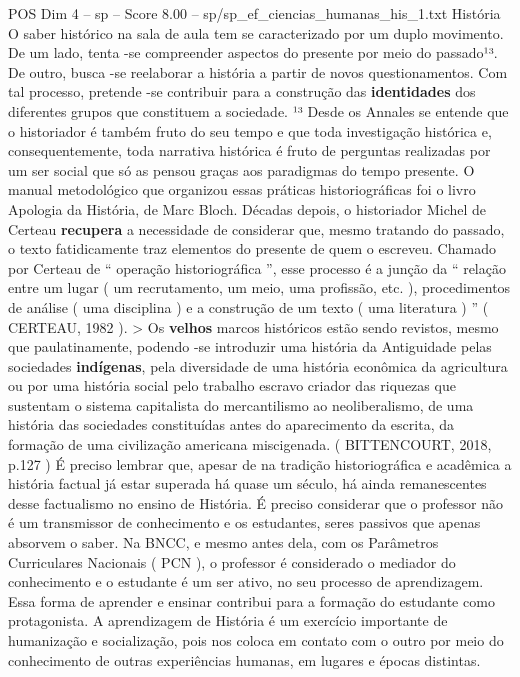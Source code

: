 \begin{textsample}{POS Dim 4 – sp – Score 8.00 – sp/sp\_ef\_ciencias\_humanas\_his\_1.txt}  \label{ex:f4_pos_252}
História O saber histórico na sala de aula tem se caracterizado por um duplo movimento.
De um lado, tenta -se compreender aspectos do presente por meio do passado¹³.
De outro, busca -se reelaborar a história a partir de novos questionamentos.
Com tal processo, pretende -se contribuir para a construção das \textbf{identidades} dos diferentes grupos que constituem a sociedade. ¹³ Desde os Annales se entende que o historiador é também fruto do seu tempo e que toda investigação histórica e, consequentemente, toda narrativa histórica é fruto de perguntas realizadas por um ser social que só as pensou graças aos paradigmas do tempo presente.
O manual metodológico que organizou essas práticas historiográficas foi o livro Apologia da História, de Marc Bloch.
Décadas depois, o historiador Michel de Certeau \textbf{recupera} a necessidade de considerar que, mesmo tratando do passado, o texto fatidicamente traz elementos do presente de quem o escreveu.
Chamado por Certeau de “ operação historiográfica ”, esse processo é a junção da “ relação entre um lugar ( um recrutamento, um meio, uma profissão, etc. ), procedimentos de análise ( uma disciplina ) e a construção de um texto ( uma literatura ) ” ( CERTEAU, 1982 ). > Os \textbf{velhos} marcos históricos estão sendo revistos, mesmo que paulatinamente, podendo -se introduzir uma história da Antiguidade pelas sociedades \textbf{indígenas}, pela diversidade de uma história econômica da agricultura ou por uma história social pelo trabalho escravo criador das riquezas que sustentam o sistema capitalista do mercantilismo ao neoliberalismo, de uma história das sociedades constituídas antes do aparecimento da escrita, da formação de uma civilização americana miscigenada. ( BITTENCOURT, 2018, p.127 ) É preciso lembrar que, apesar de na tradição historiográfica e acadêmica a história factual já estar superada há quase um século, há ainda remanescentes desse factualismo no ensino de História.
É preciso considerar que o professor não é um transmissor de conhecimento e os estudantes, seres passivos que apenas absorvem o saber.
Na BNCC, e mesmo antes dela, com os Parâmetros Curriculares Nacionais ( PCN ), o professor é considerado o mediador do conhecimento e o estudante é um ser ativo, no seu processo de aprendizagem.
Essa forma de aprender e ensinar contribui para a formação do estudante como protagonista.
A aprendizagem de História é um exercício importante de humanização e socialização, pois nos coloca em contato com o outro por meio do conhecimento de outras experiências humanas, em lugares e épocas distintas.

\end{textsample}
